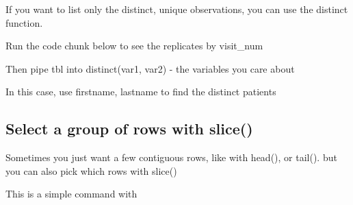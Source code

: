 \documentclass[
]{book}
\newenvironment{Shaded}{\begin{snugshade}}{\end{snugshade}}
\newcommand{\DecValTok}[1]{\textcolor[rgb]{0.00,0.00,0.81}{#1}}
\newcommand{\KeywordTok}[1]{\textcolor[rgb]{0.13,0.29,0.53}{\textbf{#1}}}
\newcommand{\NormalTok}[1]{#1}
\newcommand{\OperatorTok}[1]{\textcolor[rgb]{0.81,0.36,0.00}{\textbf{#1}}}
\newcommand{\StringTok}[1]{\textcolor[rgb]{0.31,0.60,0.02}{#1}}
\begin{document}
If you want to list only the distinct, unique observations, you can use the distinct function.

Run the code chunk below to see the replicates by visit\_num

Then pipe tbl into
distinct(var1, var2) - the variables you care about

In this case, use firstname, lastname to find the distinct patients

\begin{Shaded}
\end{Shaded}

\hypertarget{select-a-group-of-rows-with-slice}{%
\subsection{Select a group of rows with slice()}\label{select-a-group-of-rows-with-slice}}

Sometimes you just want a few contiguous rows, like with head(), or tail().
but you can also pick which rows with slice()

This is a simple command with
\end{document}
